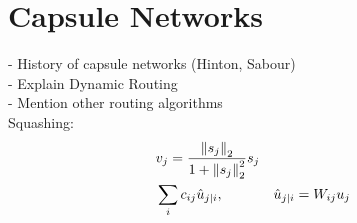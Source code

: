 
\section{Capsule Networks}
- History of capsule networks (Hinton, Sabour) \\
- Explain Dynamic Routing \\
- Mention other routing algorithms \\

Squashing:
\begin{equation}
\begin{aligned}
& v_j = \frac{\left \lVert s_j \right \rVert _2}{1 + \left \lVert s_j \right \rVert _2^2} s_j \\
& \sum_{i} c_{ij} \hat{u}_{j \vert i}, & & \hat{u}_{j \vert i} = W_{ij}u_j
\end{aligned}
\end{equation}